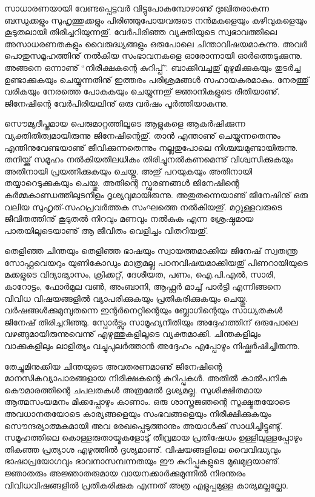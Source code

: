 \newpage
{}
സാധാരണയായി വേണ്ടപ്പെട്ടവര്‍ വിട്ടുപോകുമ്പോഴാണു് ദുഃഖിതരാകുന്ന ബന്ധുക്കളും സുഹൃത്തുക്കളും പിരിഞ്ഞുപോയവരുടെ നന്‍മകളെയും
കഴിവുകളെയും കൂടുതലായി തിരിച്ചറിയുന്നതു്. വേര്‍പിരിഞ്ഞ വ്യക്തിയുടെ സ്വഭാവത്തിലെ അസാധരണതകളും വൈരുദ്ധ്യങ്ങളും ഒരുപോലെ
ചിന്താവിഷയമാകുന്നു. അവര്‍ പൊതുസമൂഹത്തിനു് നല്‍കിയ സംഭാവനകളെ ഓരോന്നായി ഓര്‍ത്തെടുക്കുന്നു. അങ്ങനെ ഒന്നാണു്
``നിരീക്ഷകന്റെ കുറിപ്പ്''. ബാക്കിവച്ചതു് മുഴുമിക്കുകയും തുടര്‍ച്ച ഉണ്ടാക്കുകയും ചെയ്യുന്നതിനു് ഇത്തരം പരിശ്രമങ്ങള്‍ സഹായകരമാകും.
നേരത്തു് വരികയും നേരത്തെ പോകുകയും ചെയ്യുന്നതു് ജ്ഞാനികളുടെ രീതിയാണു്. ജിനേഷിന്റെ വേര്‍പിരിയലിനു് ഒരു വര്‍ഷം പൂര്‍ത്തിയാകുന്നു.

സൌമ്യദീപ്തമായ പെരുമാറ്റത്തിലൂടെ ആളുകളെ ആകര്‍ഷിക്കുന്ന വ്യക്തിതിത്വമായിരുന്നു ജിനേഷിന്റെതു്. താന്‍ എന്താണു് ചെയ്യുന്നതെന്നും
എന്തിനുവേണ്ടയാണു് ജീവിക്കുന്നതെന്നും നല്ലതുപോലെ നിശ്ചയമുണ്ടായിരുന്നു. തനിയ്ക്കു് സമൂഹം നല്‍കിയതിലധികം തിരിച്ചുനല്‍കണമെന്നു്
വിശ്വസിക്കുകയും അതിനായി പ്രയത്നിക്കുകയും ചെയ്തു. അതു് പറയുകയും അതിനായി തയ്യാറെടുക്കുകയും ചെയ്തു. അതിന്റെ സ്ഫുരണങ്ങള്‍
ജിനേഷിന്റെ കര്‍മ്മകാണ്ഡത്തിലുടനീളം ദൃശ്യവുമായിരുന്നു. അതുതന്നെയാണു് ജിനേഷിനു് ഒരു വലിയ സുഹൃത്-സഹപ്രവര്‍ത്തക സംഘത്തെ
നല്‍കിയതു്. മറ്റുള്ളവരുടെ ജീവിതത്തിനു് കൂടുതല്‍ നിറവും മണവും നല്‍കുക എന്ന ശ്രേഷ്ഠമായ പാതയിലൂടെയാണു് ആ ജീവിതം വെളിച്ചം വിതറിയതു്.

തെളിഞ്ഞ ചിന്തയും തെളിഞ്ഞ ഭാഷയും സ്വായത്തമാക്കിയ ജിനേഷ് സ്വതന്ത്ര സോഫ്റ്റവെയറും യുണികോഡും മാത്രമല്ല പഠനവിഷയമാക്കിയതു് 
പിണറായിയുടെ മക്കളുടെ വിദ്യാഭ്യാസം, ക്രിക്കറ്റ്, ദേശീയത, പണം, ഐ.പി.എല്‍, സാരി, കാറോട്ടം, ഫോര്‍മുല വണ്‍, അംബാനി, ആഫ്റ്റര്‍ 
മാച്ച് പാര്‍ട്ടി എന്നിങ്ങനെ വിവിധ വിഷയങ്ങളില്‍ വ്യാപരിക്കുകയും പ്രതികരിക്കുകയും ചെയ്തു. വര്‍ഷങ്ങള്‍ക്കുമുമ്പുതന്നെ ഇന്റര്‍നെറ്റിന്റെയും 
ബ്ലോഗിന്റെയും സാധ്യതകള്‍ ജിനേഷ് തിരിച്ചറിഞ്ഞു.  സ്പോര്‍ട്സും സാമൂഹ്യനീതിയും അദ്ദേഹത്തിന് ഒരുപോലെ വഴങ്ങുമായിരുന്നുവെന്നു് 
എഴുത്തുകളിലൂടെ വ്യക്തമാക്കി. ചിന്തകളിലും വാക്കുകളിലും ലാളിത്യം വച്ചുപുലര്‍ത്താന്‍ അദ്ദേഹം എപ്പോഴും നിഷ്ക്കര്‍ഷിച്ചിരുന്നു. 

തേച്ചുമിനുക്കിയ ചിന്തയുടെ അവതരണമാണു് ജിനേഷിന്റെ മാനസികവ്യാപാരങ്ങളായ നിരീക്ഷകന്റെ കുറിപ്പുകള്‍. അതില്‍ കാല്‍പനിക കൌമാരത്തിന്റെ 
ചപലതകള്‍ അത്രമേല്‍ ദൃശ്യമല്ല. സുശിക്ഷിതമായ ആത്മസംയമനം മിക്കപ്പോഴും കാണാം. ഒരു ശാസ്ത്രജഞന്റെ സൂക്ഷ്മതയോടെ അവധാനതയോടെ 
കാര്യങ്ങളെയും സംഭവങ്ങളെയും നിരീക്ഷിക്കുകയും സൌന്ദര്യാത്മകമായി അവ രേഖപ്പെടുത്താനും അയാള്‍ക്കു് സാധിച്ചിട്ടുണ്ടു്. സമൂഹത്തിലെ 
കൊള്ളരുതായ്മകളോടു് തീവ്രമായ പ്രതിഷേധം ഉള്ളിലുള്ളപ്പോഴും തികഞ്ഞ പ്രത്യാശ എഴുത്തില്‍ ദൃശ്യമാണു്. വിഷയങ്ങളിലെ വൈവിദ്ധ്യവും 
ഭാഷാപ്രയോഗവും ഭാവനാസമ്പന്നതയും ഈ കുറിപ്പുകളുടെ മുഖമുദ്രയാണു്. ജ്ഞാതരും അജ്ഞാതരുമായ വായനക്കാര്‍ക്കുമുന്നില്‍ നിരന്തരം 
വിവിധവിഷങ്ങളില്‍ പ്രതികരിക്കുക എന്നത് അത്ര എളുപ്പമുള്ള കാര്യമല്ലല്ലോ.

